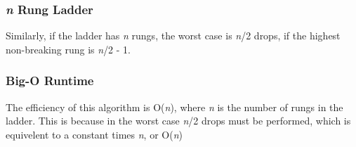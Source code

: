 \documentclass[titlepage]{article}
\numberwithin{equation}{subsection}
\begin{document}
\subsubsection{\textit{n} Rung Ladder}
Similarly, if the ladder has \textit{n} rungs, the worst case is \textit{n}/2 drops, if the highest non-breaking
rung is \textit{n}/2 - 1.
\subsubsection{Big-O Runtime}
The efficiency of this algorithm is O(\textit{n}), where \textit{n} is the number of
rungs in the ladder. This is because in the worst case \textit{n}/2 drops must be performed,
which is equivelent to a constant times \textit{n}, or O(\textit{n})
\end{document}
